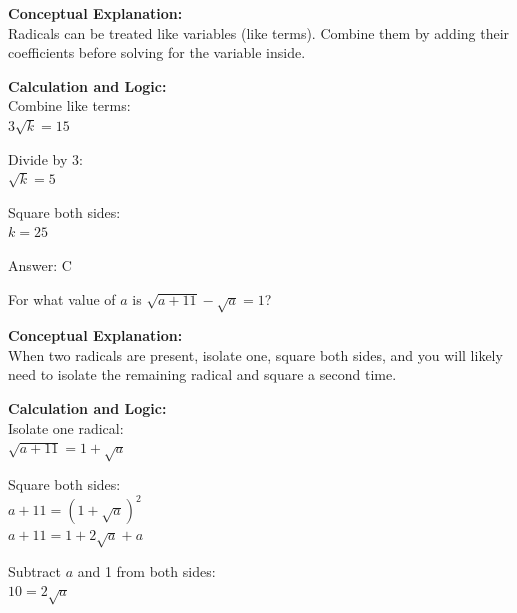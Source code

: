 \documentclass[11pt,paper=a4,answers]{exam}
\begin{document}
\begin{questions}
\begin{solution}
\textbf{Conceptual Explanation:} \\
Radicals can be treated like variables (like terms). Combine them by adding their coefficients before solving for the variable inside.

\vspace{20pt}

\textbf{Calculation and Logic:} \\
Combine like terms: \\
$3\sqrt{k} = 15$

\vspace{10pt}

Divide by 3: \\
$\sqrt{k} = 5$

\vspace{10pt}

Square both sides: \\
$k = 25$

\vspace{25pt}

Answer: \colorbox{yellow!100}{C}
\end{solution}

\vspace{40pt}

\question
For what value of $a$ is $\sqrt{a + 11} - \sqrt{a} = 1$?

\begin{solution}
\textbf{Conceptual Explanation:} \\
When two radicals are present, isolate one, square both sides, and you will likely need to isolate the remaining radical and square a second time.

\vspace{20pt}

\textbf{Calculation and Logic:} \\
Isolate one radical: \\
$\sqrt{a + 11} = 1 + \sqrt{a}$

\vspace{10pt}

Square both sides: \\
$a + 11 = (1 + \sqrt{a})^2$ \\
$a + 11 = 1 + 2\sqrt{a} + a$

\vspace{10pt}

Subtract $a$ and 1 from both sides: \\
$10 = 2\sqrt{a}$


\end{solution}
\end{questions}
\end{document}
